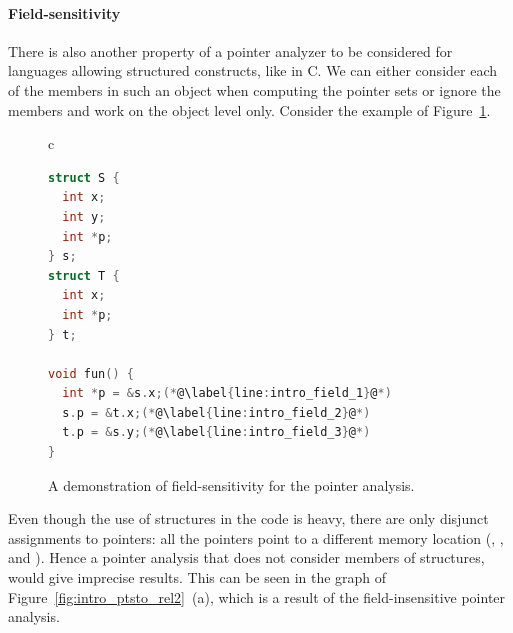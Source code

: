 \paragraph{Field-sensitivity} There is also another property of a pointer
analyzer to be considered for languages allowing structured constructs, like
 in C. We can either consider each of the members in such an
object when computing the pointer sets or ignore the members and work on the
object level only. Consider the example of Figure~\ref{fig:intro_pts_field}.
\begin{figure}[htb]
  \begin{center}
  \begin{tabular}{c}
  \begin{lstlisting}[language=C]
struct S {
  int x;
  int y;
  int *p;
} s;
struct T {
  int x;
  int *p;
} t;

void fun() {
  int *p = &s.x;(*@\label{line:intro_field_1}@*)
  s.p = &t.x;(*@\label{line:intro_field_2}@*)
  t.p = &s.y;(*@\label{line:intro_field_3}@*)
}
  \end{lstlisting}
  \end{tabular}
  \end{center}
  \caption{A demonstration of field-sensitivity for the pointer analysis.}
  \label{fig:intro_pts_field}
\end{figure}
Even though the use of structures in the code is heavy, there are only
disjunct assignments to pointers: all the pointers point to a different memory
location (, , and ). Hence a pointer analysis
that does not consider members of structures, would give imprecise results.
This can be seen in the graph of Figure~\ref{fig:intro_ptsto_rel2}~(a), which
is a result of the field-insensitive pointer analysis.
